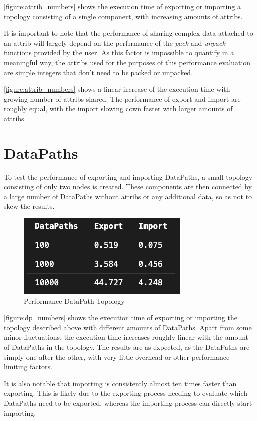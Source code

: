 \autoref{figure:attrib_numbers} shows the execution time of exporting or importing a topology consisting of a single component, with increasing amounts of attribs.

It is important to note that the performance of sharing complex data attached to an attrib will largely depend on the performance of the \emph{pack} and \emph{unpack} functions provided by the user.
As this factor is impossible to quantify in a meaningful way, the attribs used for the purposes of this performance evaluation are simple integers that don't need to be packed or unpacked.

\autoref{figure:attrib_numbers} shows a linear increase of the execution time with growing number of attribs shared. The performance of export and import are roughly equal, with the import slowing down faster with larger amounts of attribs.

\section{DataPaths}
To test the performance of exporting and importing DataPaths, a small topology consisting of only two nodes is created.
These components are then connected by a large number of DataPaths without attribs or any additional data, so as not to skew the results.

\begin{figure}[ht]
    \includegraphics[scale=0.75]{images/dp_numbers_old.png} %
    \centering
    \caption{Performance DataPath Topology}
    \label{figure:dp_numbers}
\end{figure}

\autoref{figure:dp_numbers} shows the execution time of exporting or importing the topology described above with different amounts of DataPaths.
Apart from some minor fluctuations, the execution time increases roughly linear with the amount of DataPaths in the topology.
The results are as expected, as the DataPaths are simply one after the other, with very little overhead or other performance limiting factors.

It is also notable that importing is consistently almost ten times faster than exporting.
This is likely due to the exporting process needing to evaluate which DataPaths need to be exported, whereas the importing process can directly start importing.